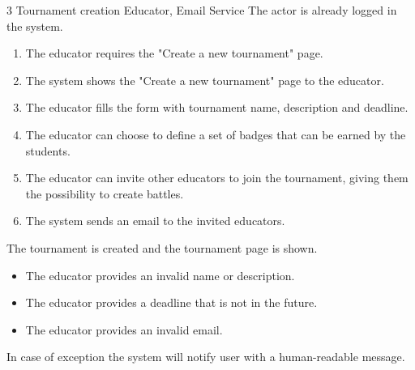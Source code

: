 \usecase
{3}
{Tournament creation}
{Educator, Email Service}
{The actor is already logged in the system.}
{
    \begin{enumerate}
        \item The educator requires the "Create a new tournament" page.
        \item The system shows the "Create a new tournament" page to the educator.
        \item The educator fills the form with tournament name, description and deadline.
        \item The educator can choose to define a set of badges that can be earned by the students.
        \item The educator can invite other educators to join the tournament, giving them the possibility to create battles.
        \item The system sends an email to the invited educators.
    \end{enumerate}
}
{The tournament is created and the tournament page is shown.}
{
    \begin{itemize}
        \item The educator provides an invalid name or description.
        \item The educator provides a deadline that is not in the future.
        \item The educator provides an invalid email.
    \end{itemize}
}
{
    In case of exception the system will notify user with a human-readable message.
}

\clearpage

